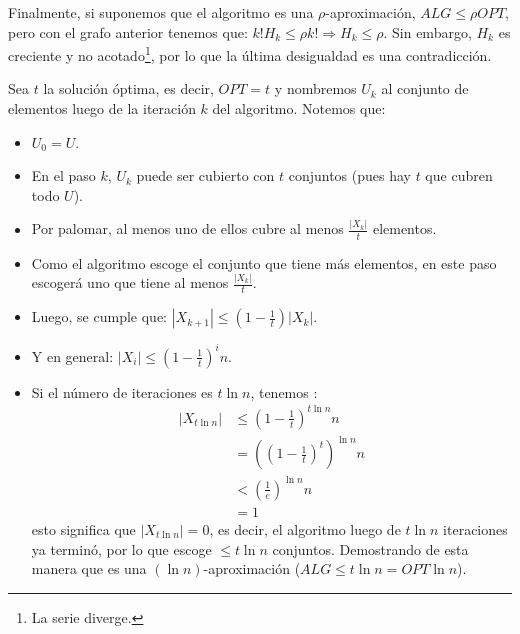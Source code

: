 \documentclass[dcc,uchile]{fcfmcourse}
\begin{document}
\begin{problems}
Finalmente, si suponemos que el algoritmo es una $\rho$-aproximación, $ALG \le \rho OPT$, pero con el grafo anterior tenemos que: $k!H_{k} \le \rho k! \Rightarrow H_{k} \le \rho$. Sin embargo, $H_{k}$ es creciente y no acotado\footnote{La serie diverge.}, por lo que la última desigualdad es una contradicción.
\newpage
\item Sea $t$ la solución óptima, es decir, $OPT = t$ y nombremos $U_{k}$ al conjunto de elementos luego de la iteración $k$ del algoritmo. Notemos que:
\begin{itemize}
    \item $U_{0} = U$.
    \item En el paso $k$, $U_{k}$ puede ser cubierto con $t$ conjuntos (pues hay $t$ que cubren todo $U$).
    \item Por palomar, al menos uno de ellos cubre al menos $\frac{|X_{k}|}{t}$ elementos.
    \item Como el algoritmo escoge el conjunto que tiene más elementos, en este paso escogerá uno que tiene al menos $\frac{|X_{k}|}{t}$.
    \item Luego, se cumple que: $|X_{k+1}| \le \left(1-\frac{1}{t}\right)|X_{k}|$.
    \item Y en general: $|X_{i}| \le \left(1-\frac{1}{t}\right)^i n$.
    \item Si el número de iteraciones es $t\ln n$, tenemos :
    \begin{align*}
        |X_{t\ln n}| &\le \left(1-\frac{1}{t}\right)^{t \ln n} n\\
        & = \left(\left(1-\frac{1}{t}\right)^t\right)^{\ln n} n\\
        & < \left(\frac{1}{e}\right)^{\ln n} n\\
        & = 1
    \end{align*}
     esto significa que $|X_{t\ln n}| = 0$, es decir, el algoritmo luego de $t\ln n$ iteraciones ya terminó, por lo que escoge $\le t\ln n$ conjuntos. Demostrando de esta manera que es una $(\ln n)$-aproximación ($ALG \le t\ln n = OPT \ln n$).
\end{itemize}
\end{problems}
\end{document}
